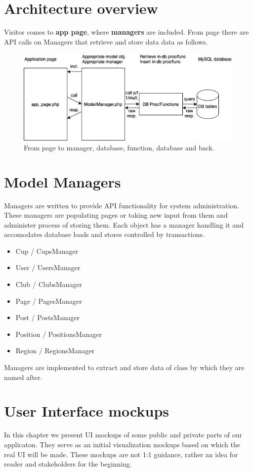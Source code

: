 \section{Architecture overview}
Visitor comes to \textbf{app page}, where \textbf{managers} are included. From page there are API calls on Managers that retrieve and store data data as follows.
\newline
\begin{figure}[h]	
	\centering	
    \includegraphics[scale=0.707]{img/app-schema.jpg}
	\caption{From page to manager, database, function, database and back.}
	\label{fig2.1:appschema}
\end{figure}
\section{Model Managers}
Managers are written to provide API functionality for system administration. These managers are populating pages or taking new input from them and administer process of storing them. Each object has a manager handling it and accomodates database loads and stores controlled by transactions.
\begin{itemize}
    \item Cup / CupsManager
    \item User / UsersManager
    \item Club / ClubsManager
    \item Page / PagesManager
    \item Post / PostsManager
    \item Position / PositionsManager
    \item Region / RegionsManager
\end{itemize}
Managers are implemented to extract and store data of class by which they are named after.
\newpage
\section{User Interface mockups}
In this chapter we present UI mockups of some public and private parts of our applicaton. They serve as an initial visualization mockups based on which the real UI will be made. These mockups are not 1:1 guidance, rather an idea for reader and stakeholders for the beginning.  
